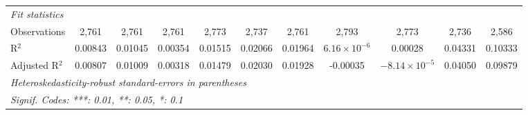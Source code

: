 \begin{tabular}{lcccccccccc}
   \midrule
   \emph{Fit statistics}\\
   Observations                              & 2,761           & 2,761           & 2,761           & 2,773           & 2,737           & 2,761           & 2,793                 & 2,773                  & 2,736           & 2,586\\  
   R$^2$                                     & 0.00843         & 0.01045         & 0.00354         & 0.01515         & 0.02066         & 0.01964         & $6.16\times 10^{-6}$  & 0.00028                & 0.04331         & 0.10333\\  
   Adjusted R$^2$                            & 0.00807         & 0.01009         & 0.00318         & 0.01479         & 0.02030         & 0.01928         & -0.00035              & $-8.14\times 10^{-5}$  & 0.04050         & 0.09879\\  
   \midrule \midrule
   \multicolumn{11}{l}{\emph{Heteroskedasticity-robust standard-errors in parentheses}}\\
   \multicolumn{11}{l}{\emph{Signif. Codes: ***: 0.01, **: 0.05, *: 0.1}}\\
\end{tabular}
\par\endgroup


